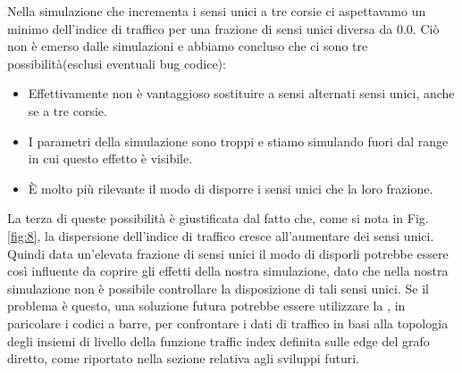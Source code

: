 \documentclass[main.tex]{subfiles}
\begin{document}
    Nella simulazione che incrementa i sensi unici a tre corsie ci aspettavamo un minimo dell'indice di traffico per una frazione di sensi unici diversa da 0.0.
    Ciò non è emerso dalle simulazioni e abbiamo concluso che ci sono tre possibilità(esclusi eventuali bug codice):
    \begin{itemize}
        \item Effettivamente non è vantaggioso sostituire a sensi alternati sensi unici, anche se a tre corsie.
        \item I parametri della simulazione sono troppi e stiamo simulando fuori dal range in cui questo effetto è visibile.
        \item \`{E} molto più rilevante il modo di disporre i sensi unici che la loro frazione.
    \end{itemize}

    La terza di queste possibilità è giustificata dal fatto che, come si nota in Fig. \ref{fig:8}, la dispersione dell'indice di traffico cresce all'aumentare dei
    sensi unici. Quindi data un'elevata frazione di sensi unici il modo di disporli potrebbe essere così influente da coprire gli effetti della nostra simulazione,
    dato che nella nostra simulazione non è possibile controllare la disposizione di tali sensi unici.
    Se il problema è questo, una soluzione futura potrebbe essere utilizzare la , in paricolare i codici a barre, 
    per confrontare i dati di traffico in basi alla topologia degli insiemi di livello della funzione traffic index definita sulle edge del grafo diretto, come riportato 
    nella sezione relativa agli sviluppi futuri.
\end{document}
